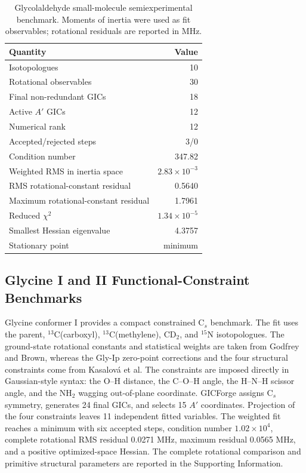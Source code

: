 \documentclass[journal=jctcce,manuscript=article,maxauthors=999]{achemso}
\begin{document}
\begin{table}
\caption{Glycolaldehyde small-molecule semiexperimental benchmark. Moments of inertia were used as fit observables; rotational residuals are reported in MHz.}
\label{tab:glycolaldehyde-fit}
\begin{tabular}{lr}
\toprule
Quantity & Value \\
\midrule
Isotopologues & 10 \\
Rotational observables & 30 \\
Final non-redundant GICs & 18 \\
Active $A'$ GICs & 12 \\
Numerical rank & 12 \\
Accepted/rejected steps & 3/0 \\
Condition number & 347.82 \\
Weighted RMS in inertia space & $2.83\times10^{-3}$ \\
RMS rotational-constant residual & 0.5640 \\
Maximum rotational-constant residual & 1.7961 \\
Reduced $\chi^2$ & $1.34\times10^{-5}$ \\
Smallest Hessian eigenvalue & 4.3757 \\
Stationary point & minimum \\
\bottomrule
\end{tabular}
\end{table}

\subsection{Glycine I and II Functional-Constraint Benchmarks}

Glycine conformer I provides a compact constrained C$_s$ benchmark. The fit
uses the parent, $^{13}$C(carboxyl), $^{13}$C(methylene), CD$_2$, and
$^{15}$N isotopologues. The ground-state rotational constants and statistical
weights are taken from Godfrey and Brown,\cite{GodfreyBrown1995ShapeGlycine}
whereas the Gly-Ip zero-point corrections and the four structural constraints
come from Kasalov{\'a} et al.\cite{Kasalova2007Glycine} The constraints are
imposed directly in Gaussian-style syntax: the O--H distance, the C--O--H
angle, the H--N--H scissor angle, and the NH$_2$ wagging out-of-plane
coordinate. GICForge assigns C$_s$ symmetry, generates 24 final GICs, and
selects 15 $A'$ coordinates. Projection of the four constraints leaves 11
independent fitted variables. The weighted fit reaches a minimum with six
accepted steps, condition number $1.02\times10^4$, complete rotational RMS
residual 0.0271 MHz, maximum residual 0.0565 MHz, and a positive
optimized-space Hessian. The complete rotational comparison and primitive
structural parameters are reported in the Supporting Information.
\end{document}
